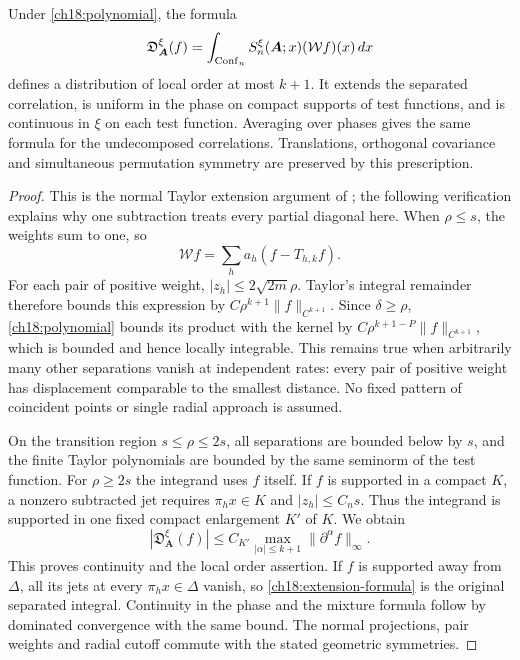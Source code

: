 \begin{theorem}
\label{ch18:extension-theorem}
Under \eqref{ch18:polynomial}, the formula
\begin{equation}
 \mathfrak D_{\boldsymbol A}^\xi(f)
   =\int_{\operatorname{Conf}_n} S_n^\xi(\boldsymbol A;x)
                                      (\mathcal Wf)(x)\,dx
 \label{ch18:extension-formula}
\end{equation}
defines a distribution of local order at most $k+1$.
It extends the separated correlation, is uniform in the phase on
compact supports of test functions, and is continuous in $\xi$ on each test function.
Averaging over phases gives the same formula for the undecomposed correlations.
Translations, orthogonal covariance and simultaneous permutation
symmetry are preserved by this prescription.
\end{theorem}
\begin{proof}
This is the normal Taylor extension argument of
\cite[Theorem~5.3]{BrunettiFredenhagen2000}; the following verification
explains why one subtraction treats every partial diagonal here.
When $\rho\le s$, the weights sum to one, so
\[
 \mathcal Wf=\sum_h a_h(f-T_{h,k}f).
\]
For each pair of positive weight, $|z_h|\le 2\sqrt{2m}\rho$.
Taylor's integral remainder therefore bounds this expression by
$C\rho^{k+1}\|f\|_{C^{k+1}}$. Since $\delta\ge\rho$,
\eqref{ch18:polynomial} bounds its product with the kernel by
$C\rho^{k+1-P}\|f\|_{C^{k+1}}$, which is bounded and hence locally
integrable. This remains true when arbitrarily many other separations
vanish at independent rates: every pair of positive weight has displacement
comparable to the smallest distance. No fixed pattern of coincident points or
single radial approach is assumed.

On the transition region $s\le\rho\le2s$, all separations are bounded
below by $s$, and the finite Taylor polynomials are bounded by the same
seminorm of the test function. For $\rho\ge 2s$ the integrand uses $f$ itself. If $f$ is supported
in a compact $K$, a nonzero subtracted jet requires $\pi_hx\in K$ and
$|z_h|\le C_ns$. Thus the integrand is supported in one fixed compact
enlargement $K'$ of $K$. We obtain
\[
 |\mathfrak D_{\boldsymbol A}^\xi(f)|
        \le C_{K'}\max_{|\alpha|\le k+1}
                              \|\partial^\alpha f\|_\infty.
\]
This proves continuity and the local order assertion. If $f$ is supported
away from $\Delta$, all its jets at every $\pi_hx\in\Delta$ vanish,
so \eqref{ch18:extension-formula} is the original separated integral.
Continuity in the phase and the mixture formula follow by dominated
convergence with the same bound. The normal projections, pair weights
and radial cutoff commute with the stated geometric symmetries.
\end{proof}

